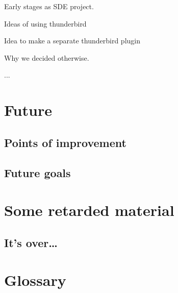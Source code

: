 \documentclass[]{usiinfthesis}
\begin{document}
Early stages as SDE project.

Ideas of using thunderbird

Idea to make a separate thunderbird plugin

Why we decided otherwise.

...

\chapter{Future}
\section{Points of improvement}
\section{Future goals}

\appendix %

\chapter{Some retarded material}
\section{It's over\dots}
\backmatter 
\chapter{Glossary} %
%
\cleardoublepage %
\end{document}
